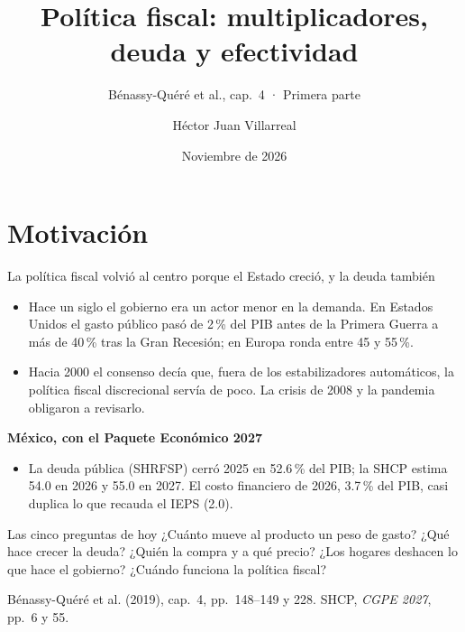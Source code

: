 \documentclass[aspectratio=169,11pt]{beamer}
\title{Política fiscal: multiplicadores, deuda y efectividad}
\subtitle{Bénassy-Quéré et al., cap.~4 · Primera parte}
\author{Héctor Juan Villarreal}
\institute{Finanzas Públicas · Maestría en Economía Aplicada\\Escuela de Gobierno y Transformación Pública · Tec de Monterrey}
\date{Noviembre de 2026}
\newcommand{\fuente}[1]{\par\vfill{\small\color{cGris}#1\par}}
\newcommand{\BQ}{Bénassy-Quéré et al. (2019), cap.~4}
\begin{document}
\section{Motivación}

\begin{frame}[plain]
  \titlepage
\end{frame}

\begin{frame}{La política fiscal volvió al centro porque el Estado creció, y la deuda también}
  \begin{itemize}
    \item Hace un siglo el gobierno era un actor menor en la demanda. En Estados Unidos el gasto público pasó de 2\,\% del PIB antes de la Primera Guerra a más de 40\,\% tras la Gran Recesión; en Europa ronda entre 45 y 55\,\%.
    \item Hacia 2000 el consenso decía que, fuera de los estabilizadores automáticos, la política fiscal discrecional servía de poco. La crisis de 2008 y la pandemia obligaron a revisarlo.
  \end{itemize}
  \pause
  \textbf{México, con el Paquete Económico 2027}
  \begin{itemize}
    \item La deuda pública (SHRFSP) cerró 2025 en 52.6\,\% del PIB; la SHCP estima 54.0 en 2026 y 55.0 en 2027. El costo financiero de 2026, 3.7\,\% del PIB, casi duplica lo que recauda el IEPS (2.0).
  \end{itemize}
  \pause
  \begin{block}{Las cinco preguntas de hoy}
    ¿Cuánto mueve al producto un peso de gasto? ¿Qué hace crecer la deuda? ¿Quién la compra y a qué precio? ¿Los hogares deshacen lo que hace el gobierno? ¿Cuándo funciona la política fiscal?
  \end{block}
  \fuente{\BQ, pp.~148--149 y 228. SHCP, \emph{CGPE 2027}, pp.~6 y 55.}
\end{frame}
\end{document}
